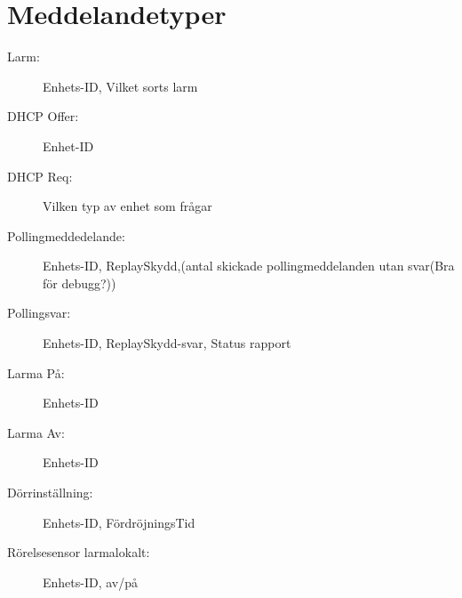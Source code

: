 \documentclass[a4paper]{article}
\begin{document}
\section{Meddelandetyper}
\begin{description}
  \item[Larm:]Enhets-ID, Vilket sorts larm
  \item[DHCP Offer:] Enhet-ID
  \item[DHCP Req:] Vilken typ av enhet som frågar
  \item[Pollingmeddedelande:] Enhets-ID, ReplaySkydd,(antal skickade pollingmeddelanden utan svar(Bra för debugg?))
  \item[Pollingsvar:] Enhets-ID, ReplaySkydd-svar, Status rapport
  \item[Larma På:] Enhets-ID
  \item[Larma Av:] Enhets-ID
  \item[Dörrinställning:] Enhets-ID, FördröjningsTid
  \item[Rörelsesensor larmalokalt:] Enhets-ID, av/på
\end{description}
\end{document}
